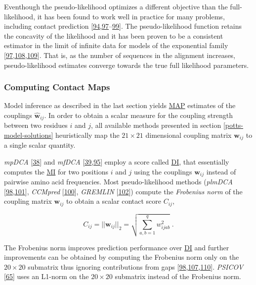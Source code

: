 \documentclass[11pt,a4paper,twoside]{book}
\newcommand{\w}{\mathbf{w}}
\newcommand{\wij}{\mathbf{w}_{ij}}
\newcommand{\wijab}{w_{ijab}}
\theoremstyle{definition}
\theoremstyle{definition}
\theoremstyle{remark}
\begin{document}
Eventhough the pseudo-likelihood optimizes a different objective than
the full-likelihood, it has been found to work well in practice for many
problems, including contact prediction
{[}\protect\hyperlink{ref-Murphy2012}{94},\protect\hyperlink{ref-Koller2009}{97}--\protect\hyperlink{ref-Stein2015a}{99}{]}.
The pseudo-likelihood function retains the concavity of the likelihood
and it has been proven to be a consistent estimator in the limit of
infinite data for models of the exponential family
{[}\protect\hyperlink{ref-Koller2009}{97},\protect\hyperlink{ref-Besag1975}{108},\protect\hyperlink{ref-Gidas1988}{109}{]}.
That is, as the number of sequences in the alignment increases,
pseudo-likelihood estimates converge towards the true full likelihood
parameters.

\subsubsection{Computing Contact Maps}\label{post-processing-heuristics}

Model inference as described in the last section yields
\protect\hyperlink{abbrev}{MAP} estimates of the couplings
\(\hat{\w}_{ij}\). In order to obtain a scalar measure for the coupling
strength between two residues \(i\) and \(j\), all available methods
presented in section \ref{potts-model-solutions} heuristically map the
\(21 \! \times \! 21\) dimensional coupling matrix \(\wij\) to a single
scalar quantity.

\emph{mpDCA} {[}\protect\hyperlink{ref-Weigt2009}{38}{]} and
\emph{mfDCA}
{[}\protect\hyperlink{ref-Marks2011}{39},\protect\hyperlink{ref-Morcos2011}{95}{]}
employ a score called \protect\hyperlink{abbrev}{DI}, that essentially
computes the \protect\hyperlink{abbrev}{MI} for two positions \(i\) and
\(j\) using the couplings \(\wij\) instead of pairwise amino acid
frequencies. Most pseudo-likelihood methods (\emph{plmDCA}
{[}\protect\hyperlink{ref-Ekeberg2013}{98},\protect\hyperlink{ref-Ekeberg2014}{101}{]},
\emph{CCMpred} {[}\protect\hyperlink{ref-Seemayer2014}{100}{]},
\emph{GREMLIN} {[}\protect\hyperlink{ref-Kamisetty2013}{102}{]}) compute
the \emph{Frobenius norm} of the coupling matrix \(\wij\) to obtain a
scalar contact score \(C_{ij}\),

\begin{equation}
    C_{ij}  = ||\wij||_2 = \sqrt{\sum_{a,b=1}^q \wijab^2} \; .
\label{eq:frobenius-norm}
\end{equation}

The Frobenius norm improves prediction performance over
\protect\hyperlink{abbrev}{DI} and further improvements can be obtained
by computing the Frobenius norm only on the \(20 \times 20\) submatrix
thus ignoring contributions from gaps
{[}\protect\hyperlink{ref-Ekeberg2013}{98},\protect\hyperlink{ref-Baldassi2014}{107},\protect\hyperlink{ref-Feinauer2014}{110}{]}.
\emph{PSICOV} {[}\protect\hyperlink{ref-Jones2012}{65}{]} uses an
L1-norm on the \(20 \times 20\) submatrix instead of the Frobenius norm.
\end{document}
